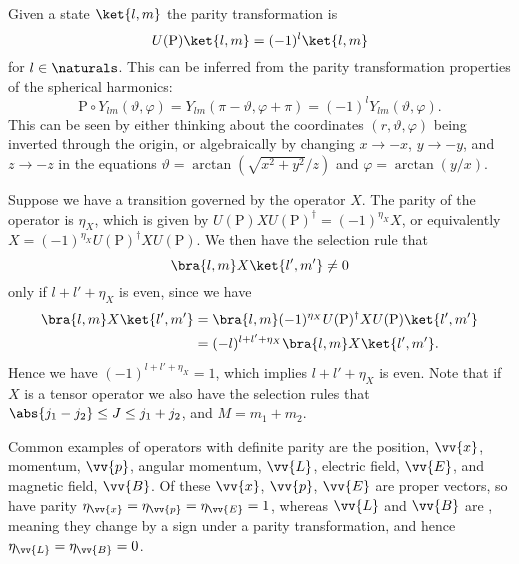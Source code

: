 \documentclass[fleqn]{NotesClass}
\newcommand*{\hermit}{\dagger}
\newcommand*{\Psym}{\mathrm{P}}
\begin{document}
    Given a state \(\ket{l, m}\) the parity transformation is
    \begin{equation}
        U(\Psym)\ket{l, m} = (-1)^l\ket{l, m}
    \end{equation}
    for \(l \in \naturals\).
    This can be inferred from the parity transformation properties of the spherical harmonics:
    \begin{equation}
        \Psym \circ Y_{lm}(\vartheta, \varphi) = Y_{lm}(\pi - \vartheta, \varphi + \pi) = (-1)^lY_{lm}(\vartheta, \varphi).
    \end{equation}
    This can be seen by either thinking about the coordinates \((r, \vartheta, \varphi)\) being inverted through the origin, or algebraically by changing \(x \to -x\), \(y \to -y\), and \(z \to -z\) in the equations \(\vartheta = \arctan(\sqrt{x^2 + y^2}/z)\) and \(\varphi = \arctan(y/x)\).
    
    Suppose we have  a transition governed by the operator \(X\).
    The parity of the operator is \(\eta_X\), which is given by \(U(\Psym) X U(\Psym)^\hermit = (-1)^{\eta_X}X\), or equivalently \(X = (-1)^{\eta_X}U(\Psym)^\hermit XU(\Psym)\).
    We then have the selection rule that
    \begin{equation}
        \bra{l, m} X \ket{l', m'} \ne 0
    \end{equation}
    only if \(l + l' + \eta_X\) is even, since we have
    \begin{align}
        \bra{l, m} X \ket{l', m'} &= \bra{l, m} (-1)^{\eta_X} U(\Psym)^\hermit XU(\Psym) \ket{l', m'}\\
        &= (-l)^{l + l' + \eta_X} \bra{l, m} X \ket{l', m'}.
    \end{align}
    Hence we have \((-1)^{l + l' + \eta_X} = 1\), which implies \(l + l' + \eta_X\) is even.
    Note that if \(X\) is a tensor operator we also have the selection rules that \(\abs{j_1 - j_2} \le J \le j_1 + j_2\), and \(M = m_1 + m_2\).
    
    Common examples of operators with definite parity are the position, \(\vv{x}\), momentum, \(\vv{p}\), angular momentum, \(\vv{L}\), electric field, \(\vv{E}\), and magnetic field, \(\vv{B}\).
    Of these \(\vv{x}\), \(\vv{p}\), \(\vv{E}\) are proper vectors, so have parity \(\eta_{\vv{x}} = \eta_{\vv{p}} = \eta_{\vv{E}} = 1\), whereas \(\vv{L}\) and \(\vv{B}\) are , meaning they change by a sign under a parity transformation, and hence \(\eta_{\vv{L}} = \eta_{\vv{B}} = 0\).
    
\end{document}
